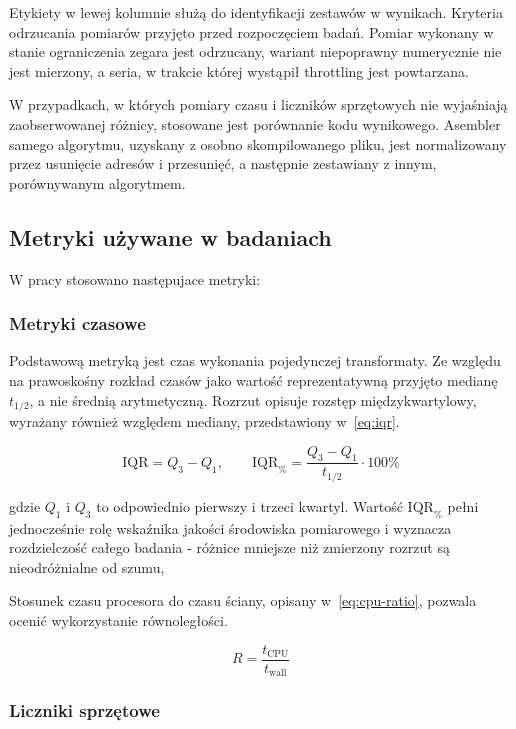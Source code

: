 Etykiety w lewej kolumnie służą do identyfikacji zestawów w wynikach.
Kryteria odrzucania pomiarów przyjęto przed rozpoczęciem badań. Pomiar
wykonany w stanie ograniczenia zegara jest odrzucany, wariant niepoprawny
numerycznie nie jest mierzony, a seria, w trakcie której wystąpił throttling jest powtarzana.

W przypadkach, w których pomiary czasu i liczników sprzętowych nie wyjaśniają
zaobserwowanej różnicy, stosowane jest porównanie kodu wynikowego. Asembler
samego algorytmu, uzyskany z osobno skompilowanego pliku, jest
normalizowany przez usunięcie adresów i przesunięć, a następnie zestawiany
z innym, porównywanym algorytmem.
\subsection{Metryki używane w badaniach}
W pracy stosowano następujace metryki:

\subsubsection{Metryki czasowe}

Podstawową metryką jest czas wykonania pojedynczej transformaty. Ze względu na
prawoskośny rozkład czasów jako wartość reprezentatywną przyjęto medianę
$t_{1/2}$, a nie średnią arytmetyczną. Rozrzut opisuje rozstęp
międzykwartylowy, wyrażany również względem mediany, przedstawiony
w~\cref{eq:iqr}.

\begin{equation}\label{eq:iqr}
\mathrm{IQR} = Q_3 - Q_1, \qquad
\mathrm{IQR}_{\%} = \frac{Q_3 - Q_1}{t_{1/2}} \cdot 100\%
\end{equation}

gdzie $Q_1$ i $Q_3$ to odpowiednio pierwszy i trzeci kwartyl. Wartość
$\mathrm{IQR}_{\%}$ pełni jednocześnie rolę wskaźnika jakości środowiska
pomiarowego i wyznacza rozdzielczość całego badania - różnice mniejsze niż
zmierzony rozrzut są nieodróżnialne od szumu,

Stosunek czasu procesora do czasu ściany, opisany
w~\cref{eq:cpu-ratio}, pozwala ocenić wykorzystanie równoległości.

\begin{equation}\label{eq:cpu-ratio}
R = \frac{t_{\mathrm{CPU}}}{t_{\mathrm{wall}}}
\end{equation}


\subsubsection{Liczniki sprzętowe}

